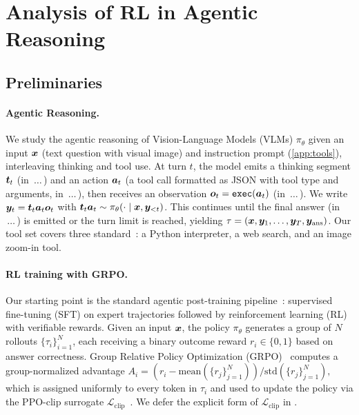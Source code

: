 \section{Analysis of RL in Agentic Reasoning}
\subsection{Preliminaries}

\paragraph{Agentic Reasoning.}
We study the agentic reasoning of Vision-Language Models (VLMs) $\pi_\theta$ given an input ${\bm{x}}$ (text question with visual image) and instruction prompt (\ref{app:tools}), interleaving thinking and tool use. At turn $t$, the model emits a thinking segment ${\bm{t}}_t$ (in \think$\,\ldots\,$\thinkr) and an action ${\bm{a}}_t$ (a tool call formatted as JSON with tool type and arguments, in \toolcall$\,\ldots\,$\toolcallr), then receives an observation ${\bm{o}}_t = \texttt{exec}({\bm{a}}_t)$ (in \tool$\,\ldots\,$\toolr). 
We write ${\bm{y}}_t = {\bm{t}}_t {\bm{a}}_t {\bm{o}}_t$ with ${\bm{t}}_t {\bm{a}}_t \sim \pi_\theta(\cdot \mid {\bm{x}}, {\bm{y}}_{<t})$. This continues until the final answer (in \answer$\,\ldots\,$\answerr) is emitted or the turn limit is reached, yielding $\tau = ({\bm{x}}, {\bm{y}}_1, \ldots, {\bm{y}}_T, {\bm{y}}_{\text{ans}})$. Our tool set covers three standard~\citep{mini-o3, pyvision-rl, deepeyesv2}: a Python interpreter, a web search, and an image zoom-in tool.

\paragraph{RL training with GRPO.}
\label{sec:prelim-rl}

Our starting point is the standard agentic post-training pipeline~\citep{pyvision-rl, deepeyesv2}: supervised fine-tuning (SFT) on expert trajectories followed by reinforcement learning (RL) with verifiable rewards. Given an input ${\bm{x}}$, the policy $\pi_\theta$ generates a group of $N$ rollouts $\{\tau_i\}_{i=1}^N$, each receiving a binary outcome reward $r_i \in \{0, 1\}$ based on answer correctness. Group Relative Policy Optimization (GRPO)~\citep{GRPO} computes a group-normalized advantage $A_i = (r_i - \mathrm{mean}(\{r_j\}_{j=1}^N)) / \mathrm{std}(\{r_j\}_{j=1}^N),$
which is assigned uniformly to every token in $\tau_i$ and used to update the policy via the PPO-clip surrogate $\mathcal{L}_{\text{clip}}$~\citep{PPO}. We defer the explicit form of $\mathcal{L}_{\text{clip}}$ in .

